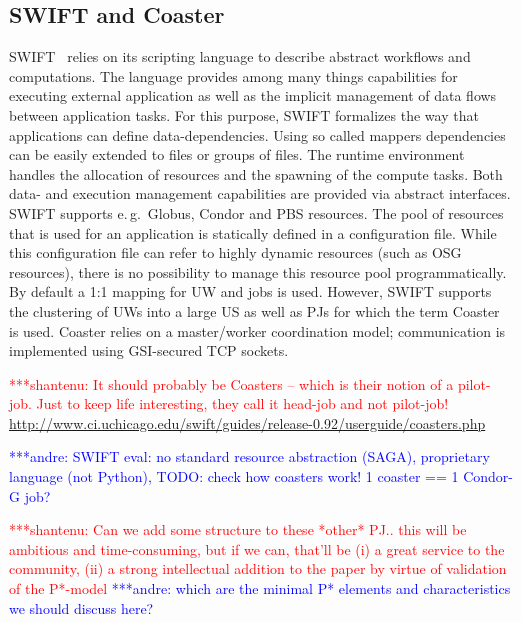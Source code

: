 \documentclass[conference,final]{IEEEtran}
\newcommand{\jhanote}[1]{ {\textcolor{red} { ***shantenu: #1 }}}
\newcommand{\alnote}[1]{ {\textcolor{blue} { ***andre: #1 }}}
\newcommand{\alnote}[1]{}
\newcommand{\jhanote}[1]{}
\begin{document}
\subsection{SWIFT and Coaster}

SWIFT~\cite{Wilde2011} relies on its scripting language to describe abstract
workflows and computations. The language provides among many things capabilities
for executing external application as well as the implicit management of data
flows between application tasks. For this purpose, SWIFT formalizes the way that
applications can define data-dependencies. Using so called mappers dependencies
can be easily extended to files or groups of files. The runtime environment
handles the allocation of resources and the spawning of the compute tasks. Both
data- and execution management capabilities are provided via abstract
interfaces. SWIFT supports e.\,g.\ Globus, Condor and PBS resources. The pool of
resources that is used for an application is statically defined in a
configuration file. While this configuration file can refer to highly dynamic
resources (such as OSG resources), there is no possibility to manage this
resource pool programmatically. By default a 1:1 mapping for UW and jobs is
used. However, SWIFT supports the clustering of UWs into a large US as
well as PJs for which the term Coaster~\cite{coasters} is used. Coaster
relies on a master/worker coordination model; communication is implemented using
GSI-secured TCP sockets.



\jhanote{It should probably be Coasters -- which is their notion of a pilot-job.
Just to keep life interesting, they call it head-job and not pilot-job!}
\url{http://www.ci.uchicago.edu/swift/guides/release-0.92/userguide/coasters.php
}


\alnote{SWIFT eval: no standard resource abstraction (SAGA), proprietary 
language (not Python), TODO: check how coasters work! 1 coaster == 1 Condor-G 
job?}








\jhanote{Can we add some structure to these *other* PJ.. this will be
  ambitious and time-consuming, but if we can, that'll be (i) a great
  service to the community, (ii) a strong intellectual addition to the
  paper by virtue of validation of the P*-model} \alnote{which are the minimal P* elements and characteristics we should discuss here?}
\end{document}
